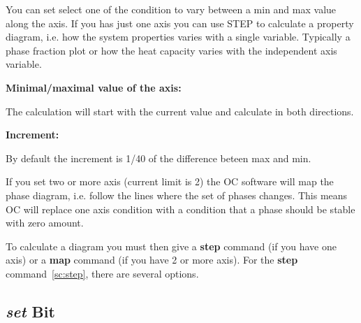 \documentclass[11pt]{article}
\begin{document}
You can set select one of the condition to vary between a min and max
value along the axis.  If you has just one axis you can use STEP to
calculate a property diagram, i.e. how the system properties varies
with a single variable.  Typically a phase fraction plot or how the
heat capacity varies with the independent axis variable.

{\bf Minimal/maximal value of the axis:}

The calculation will start with the current value and calculate in
both directions.

{\bf Increment:}

By default the increment is 1/40 of the difference beteen max and min.

If you set two or more axis (current limit is 2) the OC software will
map the phase diagram, i.e. follow the lines where the set of phases
changes.  This means OC will replace one axis condition with a condition
that a phase should be stable with zero amount.

To calculate a diagram you must then give a {\bf step} command (if you
have one axis) or a {\bf map} command (if you have 2 or more axis).
For the {\bf step} command~\ref{sc:step}, there are several options.

\hypertarget{Set which status}{}
\subsection{{\em set} Bit}

\hypertarget{helphere}{}
\hypertarget{Set status bit}{}
\hypertarget{Global status bits}{}
\end{document}
